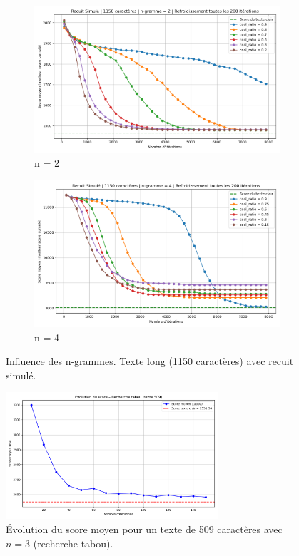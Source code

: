 \documentclass[a4paper]{article}
\begin{document}
\begin{figure}[H]
    \centering
    \begin{subfigure}[b]{0.49\textwidth}
        \includegraphics[width=\textwidth]{graphe_recuit_n_2_1150_cool_time_200.png}
        \caption{n = 2}
        \label{fig:n2-1150-200}
    \end{subfigure}
    \hfill
    \begin{subfigure}[b]{0.49\textwidth}
        \includegraphics[width=\textwidth]{graphe_recuit_n_4_1150_cool_time_200.png}
        \caption{n = 4}
        \label{fig:n4-1150-200}
    \end{subfigure}
    \caption{Influence des n-grammes. Texte long (1150 caractères) avec recuit simulé.}
    \label{fig:rs-n2-n4-1150}
\end{figure}
\begin{figure}[H]
    \centering
    \includegraphics[width=0.7\textwidth]{courbe_tabou_509.png}
    \caption{Évolution du score moyen pour un texte de 509 caractères avec $n = 3$ (recherche tabou).}
    \label{annexe:tabou_500}
\end{figure}
\end{document}
